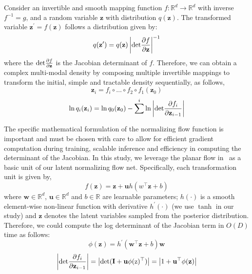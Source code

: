 \documentclass[runningheads]{llncs}
\begin{document}
Consider an invertible and smooth mapping function $f: \mathbb{R}^{d} \rightarrow \mathbb{R}^{d}$ with inverse $f^{-1}=g$, and a random variable $\textbf{z}$ with distribution $q(\textbf{z})$. The transformed variable $\textbf{z}^{\prime}=f(\textbf{z})$ follows a distribution given by: 
\begin{equation}
    q( \textbf{z}^{\prime}) = q(\textbf{z}) \left\vert {\rm det} \frac{\partial f}{\partial \textbf{z}}  \right\vert^{-1}
\end{equation}
where the ${\rm det} \frac{\partial f}{\partial \textbf{z}}$ is the Jacobian determinant of $f$. Therefore, we can obtain a complex multi-modal density by composing multiple invertible mappings to transform the initial, simple and tractable density sequentially, as follows,
\begin{equation}
    \textbf{z}_{i} = f_{i}\circ \dots \circ f_{2} \circ f_{1}(\textbf{z}_{0})
\end{equation}
\begin{equation}
\label{equ:lnqz}
    \ln q_{i}(\textbf{z}_{i}) = \ln q_{0}(\textbf{z}_{0}) - \sum^{i} \ln \left\vert {\rm det} \frac{\partial f_{i}}{\partial \textbf{z}_{i-1}} \right\vert
\end{equation}

The specific mathematical formulation of the normalizing flow function is important and must be chosen with care to allow for efficient gradient computation during training, scalable inference and efficiency in computing the determinant of the Jacobian. In this study, we leverage the planar flow in~\cite{rezende2015variational} as a basic unit of our latent normalizing flow net. Specifically, each transformation unit is given by,
\begin{equation}
    f(\textbf{z}) = \textbf{z} + \textbf{u} h(w^{\top}\textbf{z} + b)
\end{equation}
where $\textbf{w} \in \mathbb{R}^d$, $\textbf{u} \in \mathbb{R}^d$ and $b\in \mathbb{R}$ are learnable parameters; $h(\cdot)$ is a smooth element-wise non-linear function with derivative $h^{\prime}(\cdot)$ (we use $\tanh$ in our study) and $\mathbf{z}$ denotes the latent variables sampled from the posterior distribution. Therefore, we could compute the log determinant of the Jacobian term in $O(D)$ time as follows:
\begin{equation}
    \phi(\textbf{z}) = h^{\prime}( \textbf{w}^{\top} \textbf{z}+b) \textbf{w}
\end{equation}
\begin{equation}
    \left\vert {\rm det} \frac{\partial f_{i}}{\partial \textbf{z}_{i-1}} \right\vert = \left\vert \rm{det}(\textbf{I} + \textbf{u} \phi(z)^{\top}) \right\vert = \left\vert 1+\textbf{u}^{\top}\phi(\textbf{z}) \right\vert
\end{equation}
\end{document}
